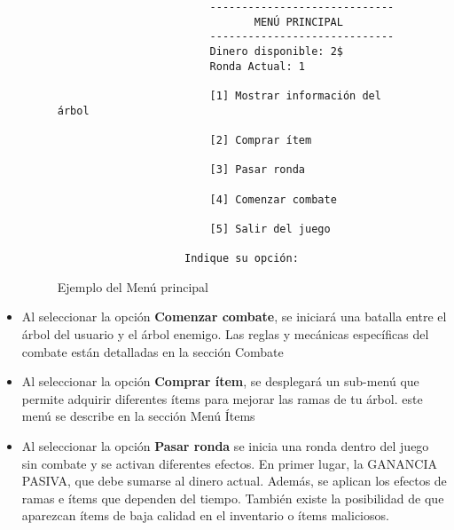 \begin{itemize}


\begin{figure}[H]
    \centering
    
    \begin{verbatim}
                        -----------------------------
                               MENÚ PRINCIPAL
                        -----------------------------
                        Dinero disponible: 2$
                        Ronda Actual: 1
 
                        [1] Mostrar información del árbol
                    
                        [2] Comprar ítem
                    
                        [3] Pasar ronda

                        [4] Comenzar combate

                        [5] Salir del juego
                    
                    Indique su opción: 
    \end{verbatim}
    \caption{Ejemplo del Menú principal}
    \label{fig:enter-label}
\end{figure}

    \item Al seleccionar la opción \textbf{Comenzar combate}, se iniciará una batalla entre el árbol del usuario y el árbol enemigo. Las reglas y mecánicas específicas del combate están detalladas en la sección Combate     
    
    \item Al seleccionar la opción \textbf{Comprar ítem}, se desplegará un sub-menú que permite adquirir diferentes ítems para mejorar las ramas de tu árbol. este menú se describe en la sección  Menú Ítems 
    
    \item Al seleccionar la opción \textbf{Pasar ronda} se inicia una ronda dentro del juego sin combate y se activan diferentes efectos. En primer lugar, la  GANANCIA PASIVA, que debe sumarse al dinero actual. Además, se aplican los efectos de ramas e ítems que dependen del tiempo. También existe la posibilidad de que aparezcan ítems de baja calidad en el inventario o ítems maliciosos. 
     
    
    

\end{itemize}
